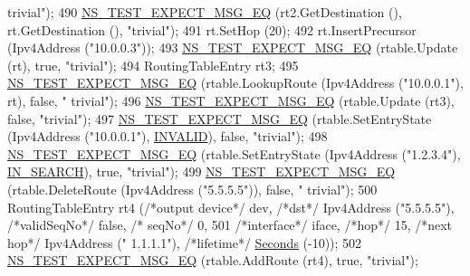 \begin{DoxyCode}
{      trivial"});
490     \hyperlink{group__testing_ga7304ba46a28d8cf08dfdfd6499cf7068}{NS\_TEST\_EXPECT\_MSG\_EQ} (rt2.GetDestination (), rt.GetDestination (), \textcolor{stringliteral}{"trivial"});
491     rt.SetHop (20);
492     rt.InsertPrecursor (Ipv4Address (\textcolor{stringliteral}{"10.0.0.3"}));
493     \hyperlink{group__testing_ga7304ba46a28d8cf08dfdfd6499cf7068}{NS\_TEST\_EXPECT\_MSG\_EQ} (rtable.Update (rt), \textcolor{keyword}{true}, \textcolor{stringliteral}{"trivial"});
494     RoutingTableEntry rt3;
495     \hyperlink{group__testing_ga7304ba46a28d8cf08dfdfd6499cf7068}{NS\_TEST\_EXPECT\_MSG\_EQ} (rtable.LookupRoute (Ipv4Address (\textcolor{stringliteral}{"10.0.0.1"}), rt), \textcolor{keyword}{false}, \textcolor{stringliteral}{"
      trivial"});
496     \hyperlink{group__testing_ga7304ba46a28d8cf08dfdfd6499cf7068}{NS\_TEST\_EXPECT\_MSG\_EQ} (rtable.Update (rt3), \textcolor{keyword}{false}, \textcolor{stringliteral}{"trivial"});
497     \hyperlink{group__testing_ga7304ba46a28d8cf08dfdfd6499cf7068}{NS\_TEST\_EXPECT\_MSG\_EQ} (rtable.SetEntryState (Ipv4Address (\textcolor{stringliteral}{"10.0.0.1"}), 
      \hyperlink{group__aodv_gga44216921a9c725a5ab8bc19059052a26a0d7b8118b2af9344a91683148f1261c3}{INVALID}), \textcolor{keyword}{false}, \textcolor{stringliteral}{"trivial"});
498     \hyperlink{group__testing_ga7304ba46a28d8cf08dfdfd6499cf7068}{NS\_TEST\_EXPECT\_MSG\_EQ} (rtable.SetEntryState (Ipv4Address (\textcolor{stringliteral}{"1.2.3.4"}), 
      \hyperlink{group__aodv_gga44216921a9c725a5ab8bc19059052a26aba44cda5a5df371b6567f70d7d8311fa}{IN\_SEARCH}), \textcolor{keyword}{true}, \textcolor{stringliteral}{"trivial"});
499     \hyperlink{group__testing_ga7304ba46a28d8cf08dfdfd6499cf7068}{NS\_TEST\_EXPECT\_MSG\_EQ} (rtable.DeleteRoute (Ipv4Address (\textcolor{stringliteral}{"5.5.5.5"})), \textcolor{keyword}{false}, \textcolor{stringliteral}{"
      trivial"});
500     RoutingTableEntry rt4 (\textcolor{comment}{/*output device*/} dev, \textcolor{comment}{/*dst*/} Ipv4Address (\textcolor{stringliteral}{"5.5.5.5"}), \textcolor{comment}{/*validSeqNo*/} \textcolor{keyword}{false}, \textcolor{comment}{/*
      seqNo*/} 0,
501                                              \textcolor{comment}{/*interface*/} iface, \textcolor{comment}{/*hop*/} 15, \textcolor{comment}{/*next hop*/} Ipv4Address (\textcolor{stringliteral}{"
      1.1.1.1"}), \textcolor{comment}{/*lifetime*/} \hyperlink{group__timecivil_ga33c34b816f8ff6628e33d5c8e9713b9e}{Seconds} (-10));
502     \hyperlink{group__testing_ga7304ba46a28d8cf08dfdfd6499cf7068}{NS\_TEST\_EXPECT\_MSG\_EQ} (rtable.AddRoute (rt4), \textcolor{keyword}{true}, \textcolor{stringliteral}{"trivial"});

\end{DoxyCode}
